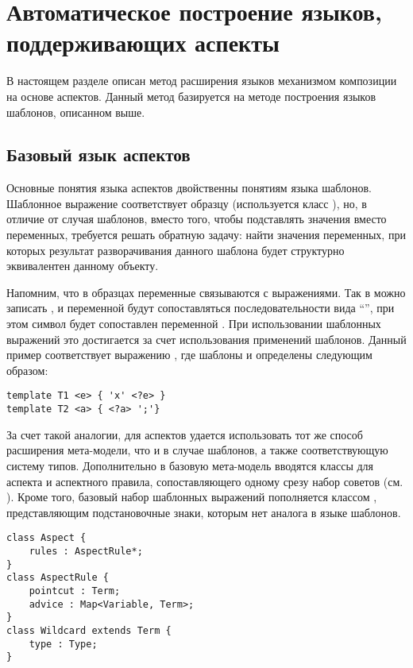 \chapter{Автоматическое построение языков, поддерживающих аспекты}

В настоящем разделе описан метод расширения языков механизмом композиции на основе аспектов. Данный метод базируется на методе построения языков шаблонов, описанном выше.

\section{Базовый язык аспектов}

Основные понятия языка аспектов двойственны понятиям языка шаблонов.
Шаблонное выражение соответствует образцу (используется класс ), но, в отличие от случая шаблонов, вместо того, чтобы подставлять значения вместо переменных, требуется решать обратную задачу: найти значения переменных, при которых результат разворачивания данного шаблона будет структурно эквивалентен данному объекту. 

Напомним, что в образцах переменные связываются с выражениями. Так в \GRM{} можно записать , и переменной  будут сопоставляться последовательности вида ``'', при этом символ  будет сопоставлен переменной . При использовании шаблонных выражений это достигается за счет использования применений шаблонов. Данный пример соответствует выражению , где шаблоны  и  определены следующим образом:
\begin{lstlisting}
template T1 <e> { 'x' <?e> }
template T2 <a> { <?a> ';'}
\end{lstlisting}

За счет такой аналогии, для аспектов удается использовать тот же способ расширения мета-модели, что и в случае шаблонов, а также соответствующую систему типов. Дополнительно в базовую мета-модель вводятся классы для аспекта и аспектного правила, сопоставляющего одному срезу набор советов (см. ). Кроме того, базовый набор шаблонных выражений пополняется классом , представляющим подстановочные знаки, которым нет аналога в языке шаблонов.

\begin{lstlisting}[label=AspectMM,float=htbp,caption=Классы базовой мета-модели языка аспектов]
class Aspect {
	rules : AspectRule*;
}
class AspectRule {
	pointcut : Term;
	advice : Map<Variable, Term>;
}
class Wildcard extends Term {
	type : Type;
}
\end{lstlisting}

